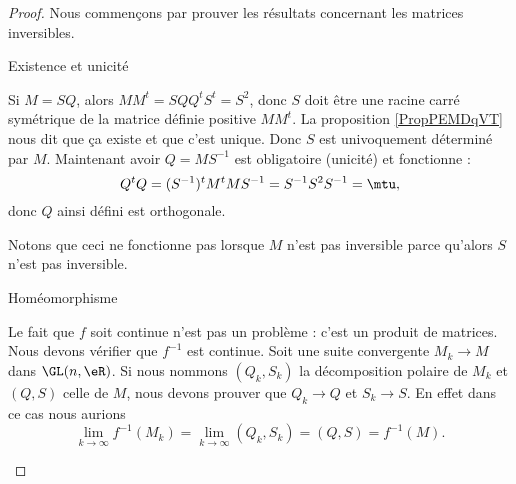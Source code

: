 \begin{proof}
    Nous commençons par prouver les résultats concernant les matrices inversibles.
    \begin{subproof}
        \item[Existence et unicité]

            Si \( M=SQ\), alors \( MM^t=SQQ^tS^t=S^2\), donc \( S\) doit être une racine carré symétrique de la matrice définie positive \( MM^t\). La proposition \ref{PropPEMDqVT} nous dit que ça existe et que c'est unique. Donc \( S\) est univoquement déterminé par \( M\). Maintenant avoir \( Q=MS^{-1}\) est obligatoire (unicité) et fonctionne :
            \begin{equation}
                Q^tQ=(S^{-1})^tM^tMS^{-1}=S^{-1}S^2S^{-1}=\mtu,
            \end{equation}
            donc \( Q\) ainsi défini est orthogonale.

            Notons que ceci ne fonctionne pas lorsque \( M\) n'est pas inversible parce qu'alors \( S\) n'est pas inversible.
        
        \item[Homéomorphisme]

            Le fait que \( f\) soit continue n'est pas un problème : c'est un produit de matrices. Nous devons vérifier que \( f^{-1}\) est continue. Soit une suite convergente \( M_k\to M\) dans \( \GL(n,\eR)\). Si nous nommons \( (Q_k,S_k)\) la décomposition polaire de \( M_k\) et \( (Q,S)\) celle de \( M\), nous devons prouver que \( Q_k\to Q\) et \( S_k\to S\). En effet dans ce cas nous aurions
            \begin{equation}    \label{EqJIkoaJv}
                \lim_{k\to \infty} f^{-1}(M_k)=\lim_{k\to \infty} (Q_k,S_k)=(Q,S)=f^{-1}(M).
            \end{equation}
            

\end{subproof}
\end{proof}
